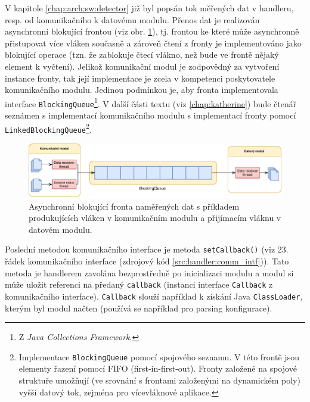 V kapitole \ref{chap:arch:sw:detector} již byl popsán tok měřených dat v handleru, resp. od komunikačního k datovému modulu. Přenos dat je realizován asynchronní blokující frontou (viz obr. \ref{fig:handler:data_queue}), tj. frontou ke které může asynchronně přistupovat více vláken současně a zároveň čtení z fronty je implementováno jako blokující operace (tzn. že zablokuje čtecí vlákno, než bude ve frontě nějaký element k vyčtení). Jelikož komunikační modul je zodpovědný za vytvoření instance fronty, tak její implementace je zcela v kompetenci poskytovatele komunikačního modulu. Jedinou podmínkou je, aby fronta implementovala interface \texttt{BlockingQueue}\footnote{Z \textit{Java Collections Framework}.}. V další části textu (viz \ref{chap:katherine}) bude čtenář seznámen s implementací komunikačního modulu s implementací fronty pomocí \texttt{LinkedBlockingQueue}\footnote{Implementace \texttt{BlockingQueue} pomocí spojového seznamu. V této frontě jsou elementy řazení pomocí FIFO (first-in-first-out). Fronty založené na spojové struktuře umožňují (ve srovnání s frontami založenými na dynamickém poly) vyšší datový tok, zejména pro vícevláknové aplikace.}.
\begin{figure}[h]
	\begin{center}
		\vspace*{0.5cm}
		\includegraphics[width=14.5cm]{figures/handler_data_queue.pdf}
		\caption{Asynchronní blokující fronta naměřených dat s příkladem produkujících vláken v komunikačním modulu a přijímacím vláknu v datovém modulu.}
		\label{fig:handler:data_queue}
	\end{center}
\end{figure}

Poslední metodou komunikačního interface je metoda \texttt{setCallback()} (viz 23. řádek komunikačního interface (zdrojový kód \ref{src:handler:comm_intf})). Tato metoda je handlerem zavolána bezprostředně po inicializaci modulu a modul si může uložit referenci na předaný \texttt{callback} (instanci interface \texttt{Callback} z komunikačního interface). \texttt{Callback} slouží například k získání Java \texttt{ClassLoader}, kterým byl modul načten (používá se například pro parsing konfigurace).

